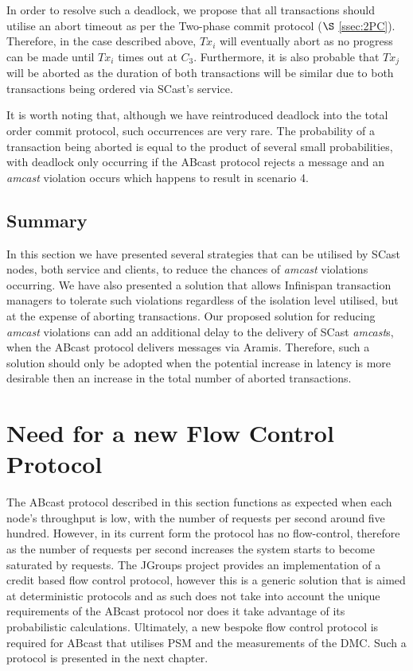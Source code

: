 \begin{description}
		In order to resolve such a deadlock, we propose that all transactions should utilise an abort timeout as per the Two-phase commit protocol ($\S$ \ref{ssec:2PC}).  Therefore, in the case described above, $Tx_i$ will eventually abort as no progress can be made until $Tx_i$ times out at $C_3$.  Furthermore, it is also probable that $Tx_j$ will be aborted as the duration of both transactions will be similar due to both transactions being ordered via \textsf{SCast}'s service.  
		
		It is worth noting that, although we have reintroduced deadlock into the total order commit protocol, such occurrences are very rare.  The probability of a transaction being aborted is equal to the product of several small probabilities, with deadlock only occurring if the \textsf{ABcast} protocol rejects a message and an \emph{amcast} violation occurs which happens to result in scenario 4.  
    \end{description}

    \subsection{Summary}
        In this section we have presented several strategies that can be utilised by \textsf{SCast} nodes, both service and clients, to reduce the chances of \emph{amcast} violations occurring.  We have also presented a solution that allows Infinispan transaction managers to tolerate such violations regardless of the isolation level utilised, but at the expense of aborting transactions.  Our proposed solution for reducing \emph{amcast} violations can add an additional delay to the delivery of \textsf{SCast} \emph{amcast}s, when the \textsf{ABcast} protocol delivers messages via \textsf{Aramis}.  Therefore, such a solution should only be adopted when the potential increase in latency is more desirable then an increase in the total number of aborted transactions.  

\section{Need for a new Flow Control Protocol}
The \textsf{ABcast} protocol described in this section functions as expected when each node's throughput is low, with the number of requests per second around five hundred.  However, in its current form the protocol has no flow-control, therefore as the number of requests per second increases the system starts to become saturated by requests.  The JGroups project provides an implementation of a credit based flow control protocol, however this is a generic solution that is aimed at deterministic protocols and as such does not take into account the unique requirements of the \textsf{ABcast} protocol nor does it take advantage of its probabilistic calculations.  Ultimately, a new bespoke flow control protocol is required for \textsf{ABcast} that utilises PSM and the measurements of the DMC.  Such a protocol is presented in the next chapter.  

